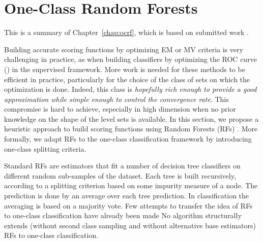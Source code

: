 \section{One-Class Random Forests}
\label{resume:ocrf}
This is a summary of Chapter~\ref{chap:ocrf}, which is based on submitted work \citep{OCRF16}.


Building accurate scoring functions by optimizing EM or MV criteria is very challenging in practice, as when building classifiers by optimizing the ROC curve (\cite{Clemencon2010}) in the supervised framework.
%
More work is needed for these methods to be efficient in practice, particularly for the choice of the class of sets on which the optimization is done.
%
Indeed, %
this class is \emph{hopefully rich enough to provide a good approximation while simple enough to control the convergence rate}. This compromise is hard to achieve, especially in high dimension when no prior knowledge on the shape of the level sets is available. 
%
%
In this section, we propose a heuristic approach to build scoring functions using Random Forests (RFs) \citep{Breiman2001, Genuer2008, Biau2016}. %
More formally, we adapt RFs to the one-class classification framework by introducing one-class splitting criteria.

Standard RFs are estimators that fit a number of decision tree
classifiers on different random sub-samples of the dataset.
Each tree is built recursively, according to a splitting criterion based on
some impurity measure of a node. The prediction is done by an average over each tree prediction. In classification the averaging is based on a majority vote.
Few attempts to transfer the idea of RFs to one-class
classification have already been made \citep{Desir12, Liu2008, Shi2012}
%
No algorithm structurally extends (without second class sampling and without alternative base estimators) RFs to one-class classification.

